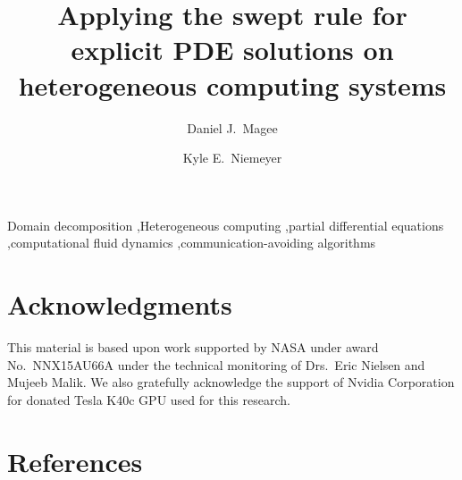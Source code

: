\documentclass[12pt,number,sort&compress,preprint]{elsarticle}
\begin{document}
\begin{frontmatter}

\title{Applying the swept rule for explicit PDE solutions on heterogeneous computing systems}

\author[OSU]{Daniel J.~Magee}
\author[OSU]{Kyle E.~Niemeyer}

\address[OSU]{School of Mechanical, Industrial, and Manufacturing Engineering,
Oregon State University, Corvallis, OR, USA
}

\begin{abstract}
    
\end{abstract}

\begin{keyword}
    Domain decomposition \sep Heterogeneous computing \sep partial differential equations \sep computational fluid dynamics \sep communication-avoiding algorithms
\end{keyword}

\end{frontmatter}

\linenumbers









% 





\section*{Acknowledgments}

This material is based upon work supported by NASA under award No.~NNX15AU66A
under the technical monitoring of Drs.~Eric Nielsen and Mujeeb Malik.
We also gratefully acknowledge the support of Nvidia Corporation for donated
Tesla K40c GPU used for this research.

\section*{References}


\end{document}
